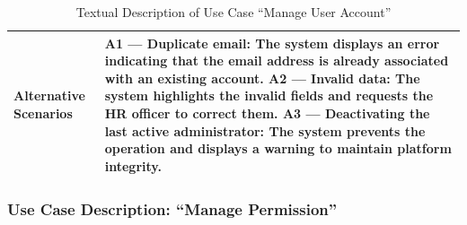 \begin{table}[H]
\begin{tabularx}{\textwidth}{|>{\bfseries\arraybackslash}p{4cm}|X|}
\hline
Alternative Scenarios &
\textbf{A1 --- Duplicate email:} The system displays an error indicating that the email address is already associated with an existing account. \newline
\textbf{A2 --- Invalid data:} The system highlights the invalid fields and requests the HR officer to correct them. \newline
\textbf{A3 --- Deactivating the last active administrator:} The system prevents the operation and displays a warning to maintain platform integrity. \\
\hline
\end{tabularx}
\caption{Textual Description of Use Case ``Manage User Account''}
\label{tab:uc-manageuser}
\end{table}
\normalsize
\setlength{\tabcolsep}{6pt}
\renewcommand{\arraystretch}{1}

\subsubsection{Use Case Description: ``Manage Permission''}

